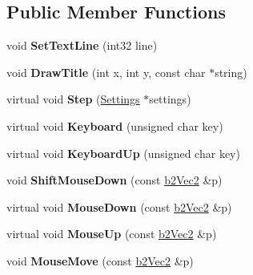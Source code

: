 \subsection*{Public Member Functions}
\begin{DoxyCompactItemize}
\item 
\hypertarget{class_test_a4c38c7fd062f199b99155f02072f6576}{void {\bfseries Set\-Text\-Line} (int32 line)}\label{class_test_a4c38c7fd062f199b99155f02072f6576}

\item 
\hypertarget{class_test_a0d270929c447dfc57be6db7186628b70}{void {\bfseries Draw\-Title} (int x, int y, const char $\ast$string)}\label{class_test_a0d270929c447dfc57be6db7186628b70}

\item 
\hypertarget{class_test_af17783fea09eebb98fc500af85f2d330}{virtual void {\bfseries Step} (\hyperlink{struct_settings}{Settings} $\ast$settings)}\label{class_test_af17783fea09eebb98fc500af85f2d330}

\item 
\hypertarget{class_test_a794e4d4a30c1e7f13b62eb775e59c012}{virtual void {\bfseries Keyboard} (unsigned char key)}\label{class_test_a794e4d4a30c1e7f13b62eb775e59c012}

\item 
\hypertarget{class_test_ab318e010754ba899e7fa646d6f22c1ab}{virtual void {\bfseries Keyboard\-Up} (unsigned char key)}\label{class_test_ab318e010754ba899e7fa646d6f22c1ab}

\item 
\hypertarget{class_test_aefa1d0ec080ed52b0a6b37664b6f75cd}{void {\bfseries Shift\-Mouse\-Down} (const \hyperlink{structb2_vec2}{b2\-Vec2} \&p)}\label{class_test_aefa1d0ec080ed52b0a6b37664b6f75cd}

\item 
\hypertarget{class_test_aa6382879085349085ffd17e212cfa52b}{virtual void {\bfseries Mouse\-Down} (const \hyperlink{structb2_vec2}{b2\-Vec2} \&p)}\label{class_test_aa6382879085349085ffd17e212cfa52b}

\item 
\hypertarget{class_test_a6b9adb9e42c85a5519ab31cd57063da7}{virtual void {\bfseries Mouse\-Up} (const \hyperlink{structb2_vec2}{b2\-Vec2} \&p)}\label{class_test_a6b9adb9e42c85a5519ab31cd57063da7}

\item 
\hypertarget{class_test_a043a2d8dea5248b839c501e03df97475}{void {\bfseries Mouse\-Move} (const \hyperlink{structb2_vec2}{b2\-Vec2} \&p)}\label{class_test_a043a2d8dea5248b839c501e03df97475}


\end{DoxyCompactItemize}
